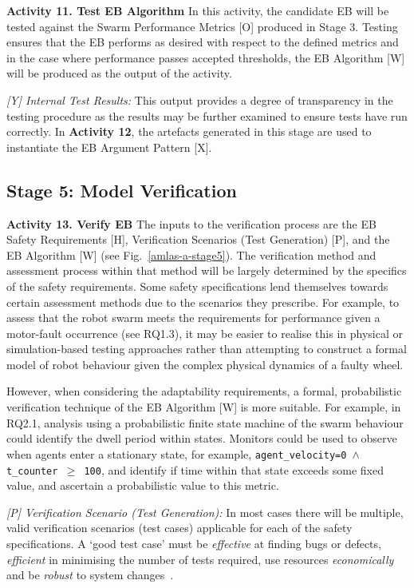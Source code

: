 \documentclass[runningheads]{llncs}
\begin{document}
\noindent\textbf{Activity 11. Test EB Algorithm} In this activity, the candidate EB will be tested against the Swarm Performance Metrics [O] produced in Stage 3. Testing ensures that the EB performs as desired with respect to the defined metrics and in the case where performance passes accepted thresholds, the EB Algorithm [W] will be produced as the output of the activity. 

\emph{[Y] Internal Test Results:} This output provides a degree of transparency in the testing procedure as the results may be further examined to ensure tests have run correctly. 
In \textbf{Activity 12}, the artefacts generated in this stage are used to instantiate the EB Argument Pattern [X].

\subsection{Stage 5: Model Verification} \label{framework-stage5}
\noindent\textbf{Activity 13. Verify EB} The inputs to the verification process are the EB Safety Requirements [H], Verification Scenarios (Test Generation) [P], and the EB Algorithm [W] (see Fig.~\ref{amlas-a-stage5}). 
%
The verification method and assessment process within that method will be largely determined by the specifics of the safety requirements. Some safety specifications lend themselves towards certain assessment methods due to the scenarios they prescribe.
%
For example, to assess that the robot swarm meets the requirements for performance given a motor-fault occurrence (see RQ1.3), it may be easier to realise this in physical or simulation-based testing approaches rather than attempting to construct a formal model of robot behaviour given the complex physical dynamics of a faulty wheel.

%
However, when considering the adaptability requirements, a formal, probabilistic verification technique of the EB Algorithm [W] is more suitable. For example, in RQ2.1, analysis using a probabilistic finite state machine of the swarm behaviour could identify the dwell period within states. Monitors could be used to observe when agents enter a stationary state, for example, \texttt{agent\_velocity=0 $\land $  t\_counter  $\ge$ 100}, and identify if time within that state exceeds some fixed value, and ascertain a probabilistic value to this metric.

\emph{[P] Verification Scenario (Test Generation):} In most cases there will be multiple, valid verification scenarios (test cases) applicable for each of the safety specifications. A `good test case' must be \emph{effective} at finding bugs or defects, \emph{efficient} in minimising the number of tests required, use resources \emph{economically} and be \emph{robust} to system changes~\cite{Fewster1999}. 
\end{document}
